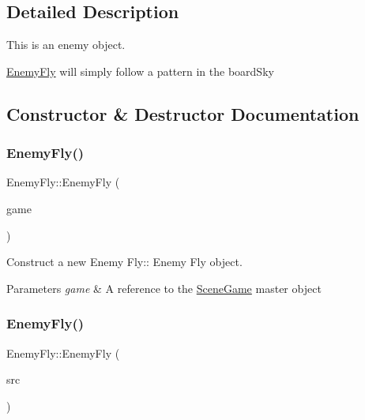 \subsection{Detailed Description}
This is an enemy object. 

\hyperlink{class_enemy_fly}{Enemy\+Fly} will simply follow a pattern in the board\+Sky 

\subsection{Constructor \& Destructor Documentation}
\mbox{\label{class_enemy_fly_a72b9e7e8a82679f4406c7825f29907c3}} 
\subsubsection{\texorpdfstring{Enemy\+Fly()}{EnemyFly()}\hspace{0.1cm}{\footnotesize\ttfamily [1/2]}}
{\footnotesize\ttfamily Enemy\+Fly\+::\+Enemy\+Fly (\begin{DoxyParamCaption}\item[{\hyperlink{class_scene_game}{Scene\+Game} \&}]{game }\end{DoxyParamCaption})\hspace{0.3cm}{\ttfamily [explicit]}}



Construct a new Enemy Fly\+:\+: Enemy Fly object. 


\begin{DoxyParams}{Parameters}
{\em game} & A reference to the \hyperlink{class_scene_game}{Scene\+Game} master object \\
\hline
\end{DoxyParams}
\mbox{\label{class_enemy_fly_a4bc5d6bc62289f70fe57abe139b053b1}} 
\subsubsection{\texorpdfstring{Enemy\+Fly()}{EnemyFly()}\hspace{0.1cm}{\footnotesize\ttfamily [2/2]}}
{\footnotesize\ttfamily Enemy\+Fly\+::\+Enemy\+Fly (\begin{DoxyParamCaption}\item[{\hyperlink{class_enemy_fly}{Enemy\+Fly} const \&}]{src }\end{DoxyParamCaption})}



